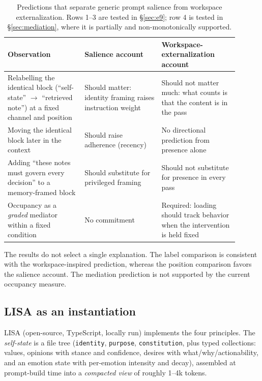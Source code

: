 \documentclass[11pt]{article}
\begin{document}
\begin{table}[h]
\centering\small
\begin{tabular}{p{0.30\linewidth}p{0.30\linewidth}p{0.30\linewidth}}
\toprule
\textbf{Observation} & \textbf{Salience account} & \textbf{Workspace-externalization account} \\
\midrule
Relabelling the identical block (``self-state'' $\to$ ``retrieved note'') at a fixed channel and position & Should matter: identity framing raises instruction weight & Should not matter much: what counts is that the content is in the pass \\
Moving the identical block later in the context & Should raise adherence (recency) & No directional prediction from presence alone \\
Adding ``these notes must govern every decision'' to a memory-framed block & Should substitute for privileged framing & Should not substitute for presence in every pass \\
Occupancy as a \emph{graded} mediator within a fixed condition & No commitment & Required: loading should track behavior when the intervention is held fixed \\
\bottomrule
\end{tabular}
\caption{Predictions that separate generic prompt salience from workspace externalization. Rows 1--3 are tested in \S\ref{sec:e9}; row 4 is tested in \S\ref{sec:mediation}, where it is partially and non-monotonically supported.}
\label{tab:predictions}
\end{table}

The results do not select a single explanation. The label comparison is consistent with the workspace-inspired prediction, whereas the position comparison favors the salience account. The mediation prediction is not supported by the current occupancy measure.

\subsection{LISA as an instantiation}
\label{sec:lisa}
LISA (open-source, TypeScript, locally run) implements the four principles. The \emph{self-state} is a file tree (\texttt{identity}, \texttt{purpose}, \texttt{constitution}, plus typed collections: values, opinions with stance and confidence, desires with what/why/actionability, and an emotion state with per-emotion intensity and decay), assembled at prompt-build time into a \emph{compacted view} of roughly 1--4k tokens.
\end{document}
